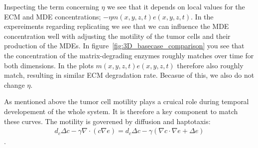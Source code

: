 Inspecting the term concerning $\eta$ we see that it depends on local values for the ECM and MDE concentrations; $-\eta m(x,y,z,t)e(x,y,z,t)$. In the expereiments regarding replicating we see that we can influence the MDE concentration well with adjusting the motility of the tumor cells and their production of the MDEs. In figure~\ref{fig:3D_basecase_comparison} you see that the concentration of the matrix-degrading enzymes roughly matches over time for both dimensions. In the plots $m(x,y,z,t)e(x,y,z,t)$ therefore also roughly match, resulting in similar ECM degradation rate. Becasue of this, we also do not change $\eta$.

As mentioned above the tumor cell motility plays a cruical role during temporal developement of the whole system. It is therefore a key component to match these curves. The motility is goverened by diffusion and haptotaxis: 
\begin{align*}
    d_c\Delta c - \gamma \nabla\cdot (c\nabla e)=d_c\Delta c - \gamma (\nabla c \cdot \nabla e + \Delta e)
\end{align*}.

